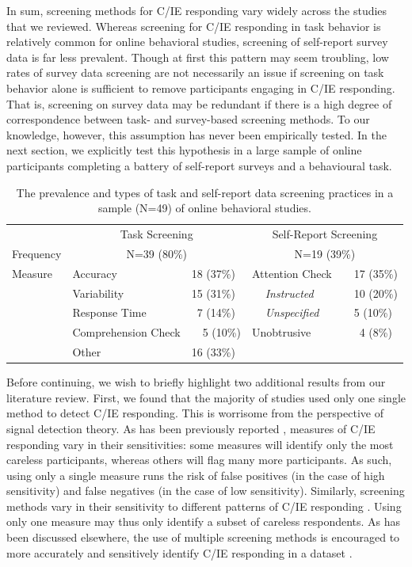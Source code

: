 \documentclass[a4paper,notitlepage,12pt]{article}
\begin{document}
In sum, screening methods for C/IE responding vary widely across the studies that we reviewed. Whereas screening for C/IE responding in task behavior is relatively common for online behavioral studies, screening of self-report survey data is far less prevalent. Though at first this pattern may seem troubling, low rates of survey data screening are not necessarily an issue if screening on task behavior alone is sufficient to remove participants engaging in C/IE responding. That is, screening on survey data may be redundant if there is a high degree of correspondence between task- and survey-based screening methods. To our knowledge, however, this assumption has never been empirically tested. In the next section, we explicitly test this hypothesis in a large sample of online participants completing a battery of self-report surveys and a behavioural task.

\begin{table}[t]
\centering
\setlength{\tabcolsep}{8pt}
\begin{tabular}{lllllll}
\toprule
& \multicolumn{2}{c}{Task Screening} & \multicolumn{4}{c}{Self-Report Screening} \\
\cmidrule(lr){2-3} \cmidrule(lr){4-7}
Frequency & \multicolumn{2}{c}{N=39 (80\%)} & \multicolumn{4}{c}{N=19 (39\%)} \\
\midrule
Measure & Accuracy & 18 (37\%) & \multicolumn{2}{l}{Attention Check} & & 17 (35\%) \\
& Variability & 15 (31\%) & & \textit{Instructed} & & 10 (20\%) \\
& Response Time & \ 7 (14\%) & & \textit{Unspecified} & & 5 (10\%) \\
& Comprehension Check & \ \ 5 (10\%) & \multicolumn{2}{l}{Unobtrusive} & & \ 4 (8\%) \\
& Other & 16 (33\%) \\
\bottomrule
\end{tabular}
\caption{The prevalence and types of task and self-report data screening practices in a sample (N=49) of online behavioral studies.}
\label{tab:screening}
\end{table}

Before continuing, we wish to briefly highlight two additional results from our literature review. First, we found that the majority of studies used only one single method to detect C/IE responding. This is worrisome from the perspective of signal detection theory. As has been previously reported \cite{desimone2018dirty}, measures of C/IE responding vary in their sensitivities: some measures will identify only the most careless participants, whereas others will flag many more participants. As such, using only a single measure runs the risk of false positives (in the case of high sensitivity) and false negatives (in the case of low sensitivity). Similarly, screening methods vary in their sensitivity to different patterns of C/IE responding \cite{curran2016methods}. Using only one measure may thus only identify a subset of careless respondents. As has been discussed elsewhere, the use of multiple screening methods is encouraged to more accurately and sensitively identify C/IE responding in a dataset \cite{curran2016methods, barends2019noncompliant}.
\end{document}
